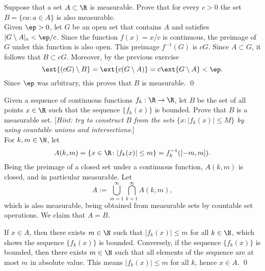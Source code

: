 \begin{hwsol}
Suppose that a set $A\subset\R$ is measurable. Prove that for every $c>0$ the set $B = \{ca\colon a\in A\}$ is also measurable. \\

\pf Given $\ep>0$, let $G$ be an open set that contains $A$ and satisfies $|G\setminus A|_e <  \ep/c$. Since the function $f(x) = x/c$ is continuous, the preimage of $G$ under this function is also open. This preimage $f^{-1}(G)$ is $cG$. Since $A\subset G$, it follows that $B\subset cG$. Moreover, by the previous exercise
	\[
	\ext{(cG)\setminus B} = \ext{c(G\setminus A)} =  c \ext{G\setminus A} < \ep.
	\]
Since $\ep$ was arbitrary, this proves that $B$ is measurable. \qed \\
\end{hwsol}


\begin{hwsol}
Given a sequence of continuous functions $f_k: \R \to \R$, let $B$ be the set of all points $x \in \R$ such that the sequence $\{ f_k(x) \}$ is bounded. Prove that $B$ is a measurable set. [\emph{Hint: try to construct $B$ from the sets $\{x \colon |f_k(x)| \leq M\}$ by using countable unions and intersections.}] \\

\pf For $k, m \in \N$, let 
        \[ 
        A(k, m) = \{ x \in \R \colon |f_k(x)| \leq m \}= f_k^{-1}([-m, m]).
        \]
Being the preimage of a closed set under a continuous function, $A(k, m)$ is closed, and in particular measurable. Let
        \[
        A:= \bigcup_{m=1}^\infty \bigcap_{k=1}^\infty A(k, m),
        \]
which is also measurable, being obtained from measurable sets by countable set operations. We claim that $A=B$. 

If $x \in A$, then there exists $m \in \N$ such that $|f_k(x)| \leq m$ for all $k \in \N$, which shows the sequence $\{ f_k(x) \}$ is bounded. Conversely, if the sequence $\{ f_k(x) \}$ is bounded, then there exists $m \in \N$ such that all elements of the sequence are at most $m$ in absolute value. This means $|f_k(x)| \leq m$ for all $k$, hence $x \in A$. \qed \\
\end{hwsol}


